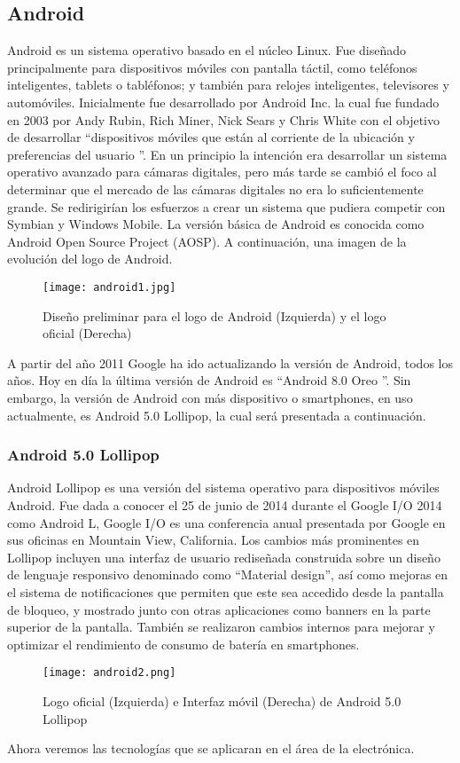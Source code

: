 \subsection{Android}

\par
Android es un sistema operativo basado en el núcleo Linux. Fue diseñado principalmente para dispositivos móviles con pantalla táctil, como teléfonos inteligentes, tablets o tabléfonos; y también para relojes inteligentes, televisores y automóviles. Inicialmente fue desarrollado por Android Inc. la cual fue fundado en 2003 por Andy Rubin, Rich Miner, Nick Sears y Chris White con el objetivo de desarrollar \textquotedblleft dispositivos móviles que están al corriente de la ubicación y preferencias del usuario \textquotedblright\cite{android-wiki}. En un principio la intención era desarrollar un sistema operativo avanzado para cámaras digitales, pero más tarde se cambió el foco al determinar que el mercado de las cámaras digitales no era lo suficientemente grande. Se redirigirían los esfuerzos a crear un sistema que pudiera competir con Symbian y Windows Mobile\cite{android-xataka}. La versión básica de Android es conocida como Android Open Source Project (AOSP)\cite{android-wiki}. A continuación, una imagen de la evolución del logo de Android. 

\begin{figure}[H]
	\texttt{[image: android1.jpg]}
	\caption{Diseño preliminar para el logo de Android (Izquierda) y el logo oficial (Derecha)}
\end{figure}

\par \noindent
A partir del año 2011 Google ha ido actualizando la versión de Android, todos los años. Hoy en día la última versión de Android es \textquotedblleft Android 8.0 Oreo \textquotedblright. Sin embargo, la versión de Android con más dispositivo o smartphones, en uso actualmente, es Android 5.0 Lollipop, la cual será presentada a continuación.

\subsubsection{Android 5.0 Lollipop} 

\par 
Android Lollipop es una versión del sistema operativo para dispositivos móviles Android. Fue dada a conocer el 25 de junio de 2014 durante el Google I/O 2014 como Android L, Google I/O es una conferencia anual presentada por Google en sus oficinas en Mountain View, California.
Los cambios más prominentes en Lollipop incluyen una interfaz de usuario rediseñada construida sobre un diseño de lenguaje responsivo denominado como \textquotedblleft Material design\textquotedblright, así como mejoras en el sistema de notificaciones que permiten que este sea accedido desde la pantalla de bloqueo, y mostrado junto con otras aplicaciones como banners en la parte superior de la pantalla. También se realizaron cambios internos para mejorar y optimizar el rendimiento de consumo de batería en smartphones\cite{lollipop}.

\begin{figure}[H]
	\centering
	\texttt{[image: android2.png]}
	\caption{Logo oficial (Izquierda) e Interfaz móvil (Derecha) de Android 5.0 Lollipop}
\end{figure}

\par \noindent
Ahora veremos las tecnologías que se aplicaran en el área de la electrónica.